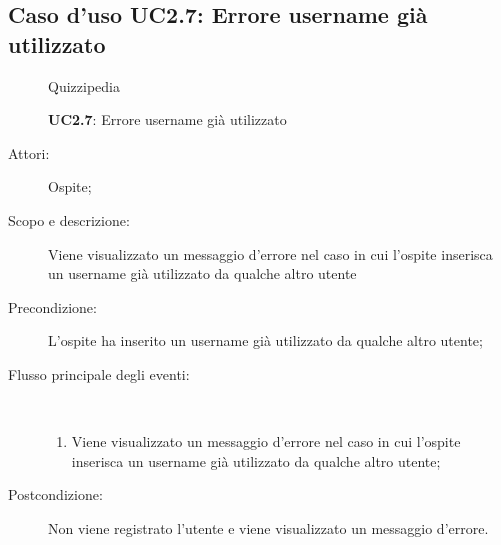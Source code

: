 \subsection{Caso d'uso UC2.7: Errore username già utilizzato}
	\begin{figure}[H]
		\centering
		\begin{resizedtikzpicture}{\textwidth}
		\begin{umlsystem}[x=0, fill=lightgray!20]{Quizzipedia}
		\end{umlsystem}
		\end{resizedtikzpicture}
		\caption{\textbf{UC2.7}: Errore username già utilizzato}
		\label{UC2.7}
	\end{figure}
\begin{description}
\item[Attori:] Ospite;
\item[Scopo e descrizione:] Viene visualizzato un messaggio d'errore nel caso in cui l'ospite inserisca un username già utilizzato da qualche altro utente
      \item[Precondizione:] L'ospite ha inserito un username già utilizzato da qualche altro utente;

        \item[Flusso principale degli eventi:] \ 
 \begin{enumerate}
          \item Viene visualizzato un messaggio d'errore nel caso in cui l'ospite inserisca un username già utilizzato da qualche altro utente;

      \end{enumerate}
    \item[Postcondizione:] Non viene registrato l'utente e viene visualizzato un messaggio d'errore.
  \end{description}
\hypertarget{UC3}{}
